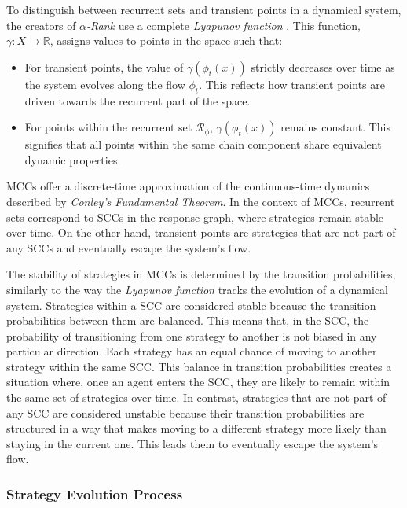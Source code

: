         \noindent
        To distinguish between recurrent sets and transient points in a dynamical system, the creators of \emph{$\alpha$-Rank} use a complete \emph{Lyapunov function} \cite{lyapunov1950}. This function, $\gamma: X \to \mathbb{R}$, assigns values to points in the space such that:
        \begin{itemize}
            \item For transient points, the value of $\gamma(\phi_t(x))$ strictly decreases over time as the system evolves along the flow $\phi_t$. This reflects how transient points are driven towards the recurrent part of the space.
            \item For points within the recurrent set $\mathcal{R}_\phi$, $\gamma(\phi_t(x))$ remains constant. This signifies that all points within the same chain component share equivalent dynamic properties.
        \end{itemize}

        \noindent
        MCCs offer a discrete-time approximation of the continuous-time dynamics described by \emph{Conley’s Fundamental Theorem}. In the context of MCCs, recurrent sets correspond to SCCs in the response graph, where strategies remain stable over time. On the other hand, transient points are strategies that are not part of any SCCs and eventually escape the system's flow.\tinydouble
        
        \noindent
        The stability of strategies in MCCs is determined by the transition probabilities, similarly to the way the \emph{Lyapunov function} tracks the evolution of a dynamical system. Strategies within a SCC are considered stable because the transition probabilities between them are balanced. This means that, in the SCC, the probability of transitioning from one strategy to another is not biased in any particular direction. Each strategy has an equal chance of moving to another strategy within the same SCC. This balance in transition probabilities creates a situation where, once an agent enters the SCC, they are likely to remain within the same set of strategies over time. In contrast, strategies that are not part of any SCC are considered unstable because their transition probabilities are structured in a way that makes moving to a different strategy more likely than staying in the current one. This leads them to eventually escape the system's flow.

    \subsubsection{Strategy Evolution Process}

